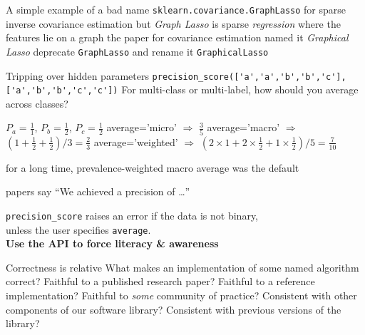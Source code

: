\documentclass[aspectratio=169, 22pt]{beamer}
\newcommand{\hl}{\textcolor{usydred}}
\begin{document}
\begin{points}{A simple example of a bad name}
	\p \verb|sklearn.covariance.GraphLasso| for sparse inverse covariance estimation
	\p but \emph{Graph Lasso} is sparse \emph{regression} where the features lie on a graph
	\p the paper for covariance estimation named it \emph{Graphical Lasso}
	\pause
	\p[Solution] deprecate \verb|GraphLasso| and rename it \verb|GraphicalLasso|
\end{points}

\begin{points}{Tripping over hidden parameters}
	\p 
\verb|precision_score(['a','a','b','b','c'], ['a','b','b','c','c'])|
	\p For multi-class or multi-label, how should you average across classes?
	\begin{itemize}
\p $P_a = \frac{1}{1}$, $P_b = \frac{1}{2}$, $P_c = \frac{1}{2}$
\p average='micro' $\Rightarrow$ $\frac{3}{5}$
\p average='macro' $\Rightarrow$ $(1 + \frac{1}{2} + \frac{1}{2}) / 3 = \frac{2}{3}$
\p average='weighted' $\Rightarrow$ $(2\times1 + 2\times\frac{1}{2} + 1\times\frac{1}{2}) / 5 = \frac{7}{10}$
	\end{itemize}
	\p for a long time, prevalence-weighted macro average was the default
	\begin{itemize}
	\p[$\therefore$] papers say ``We achieved a precision of \dots''
	\end{itemize}
	\pause
\p[Solution] \verb|precision_score| raises an error if the data is not binary,\\
unless the user specifies \verb|average|. \\ \hfill \textbf{\hl{Use the API to force literacy \& awareness}}
\end{points}

\begin{points}{Correctness is relative}
	\p What makes an implementation of some named algorithm \hl{correct}?
	\vfill
	\p Faithful to a published research paper?
	\p Faithful to a reference implementation?
	\p Faithful to \emph{some} community of practice?
	\p Consistent with other components of our software library?
	\p Consistent with previous versions of the library?
\end{points}
\end{document}
